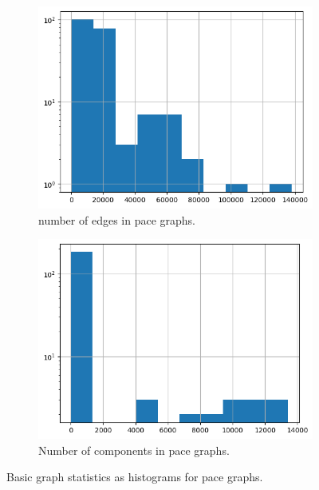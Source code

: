 \documentclass{article}
\begin{document}
\begin{figure}
     \bigskip
     \begin{subfigure}[b]{0.45\textwidth}
         \centering
         \includegraphics[width=\textwidth]{figures/pace_n_edges}
         \caption{number of edges in pace graphs.}
         \label{fig:pace_n_edges}
     \end{subfigure}
     \hfill
     \begin{subfigure}[b]{0.45\textwidth}
         \centering
         \includegraphics[width=\textwidth]{figures/pace_n_components}
         \caption{Number of components in pace graphs.}
         \label{fig:pace_n_components}
     \end{subfigure}
     \caption{Basic graph statistics as histograms for pace graphs.}
     \label{fig:pace}
\end{figure}
\end{document}
